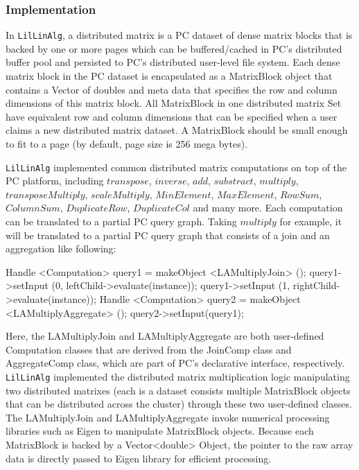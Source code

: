 \subsubsection {Implementation}
In \texttt{LilLinAlg}, a distributed matrix is a PC dataset of dense matrix
blocks that is backed by one or more pages which can be buffered/cached in PC's distributed buffer pool and
persisted to PC's distributed user-level file system. Each dense matrix
block in the PC dataset is encapsulated as a MatrixBlock object that contains a
Vector of doubles and meta data that specifies the row and column
dimensions of this matrix block. All MatrixBlock in one distributed
matrix Set have equivalent row and column dimensions that can be
specified when a user claims a new distributed matrix dataset. A
MatrixBlock should be small enough to fit to a page (by default, page size
is 256 mega bytes).

\texttt{LilLinAlg} implemented common distributed matrix
computations on top of the PC platform, including $transpose$,
$inverse$, $add$, $substract$, $multiply$, $transposeMultiply$, $scaleMultiply$, $MinElement$,
$MaxElement$, $RowSum$, $ColumnSum$, $DuplicateRow$, $DuplicateCol$
and many more. Each computation can be translated to a partial PC query
graph. Taking $multiply$ for example, it will be translated to a partial
PC query graph that consists of a join and an aggregation like following:

\begin{code}
Handle <Computation> query1 = makeObject <LAMultiplyJoin> ();
query1->setInput (0, leftChild->evaluate(instance));
query1->setInput (1, rightChild->evaluate(instance));
Handle <Computation> query2 = makeObject <LAMultiplyAggregate> ();
query2->setInput(query1);
\end{code}

Here, the LAMultiplyJoin and LAMultiplyAggregate are both user-defined Computation classes that are
derived from the JoinComp class and AggregateComp class, which are
part of PC's declarative interface,  respectively. \texttt{LilLinAlg}
implemented the distributed matrix multiplication logic manipulating
two distributed matrixes (each is a dataset consists multiple
MatrixBlock objects that can be distributed across the cluster) through these
two user-defined classes. The LAMultiplyJoin
and LAMultiplyAggregate invoke numerical processing libraries such as
Eigen to manipulate MatrixBlock objects. Because each
MatrixBlock is backed by a Vector<double> Object, the pointer to the
raw array data is directly passed to Eigen library for efficient processing.

